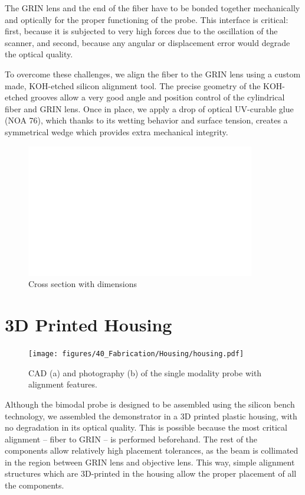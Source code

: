 The GRIN lens and the end of the fiber have to be bonded together mechanically and optically for the proper functioning of the probe. This interface is critical: first, because it is subjected to very high forces due to the oscillation of the scanner, and second, because any angular or displacement error would degrade the optical quality.

To overcome these challenges, we align the fiber to the GRIN lens using a custom made, KOH-etched silicon alignment tool. The precise geometry of the KOH-etched grooves allow a very good angle and position control of the cylindrical fiber and GRIN lens. Once in place, we apply a drop of optical UV-curable glue (NOA 76), which thanks to its wetting behavior and surface tension, creates a symmetrical wedge which provides extra mechanical integrity.

\begin{figure}[h!]\centering \includegraphics[width=10cm,draft]{figures/foo.png}
      \caption{Cross section with dimensions}
\end{figure}


\clearpage
\section{3D Printed Housing}
\begin{figure}[h!]\centering \texttt{[image: figures/40\_Fabrication/Housing/housing.pdf]}
      \caption{CAD (a) and photography (b) of the single modality probe with alignment features.}
      \label{fig:housing}
\end{figure}


Although the bimodal probe is designed to be assembled using the silicon bench technology, we assembled the demonstrator in a 3D printed plastic housing, with no degradation in its optical quality. This is possible because the most critical alignment -- fiber to GRIN -- is performed beforehand. The rest of the components allow relatively high placement tolerances, as the beam is collimated in the region between GRIN lens and objective lens. This way, simple alignment structures which are 3D-printed in the housing allow the proper placement of all the components. 

